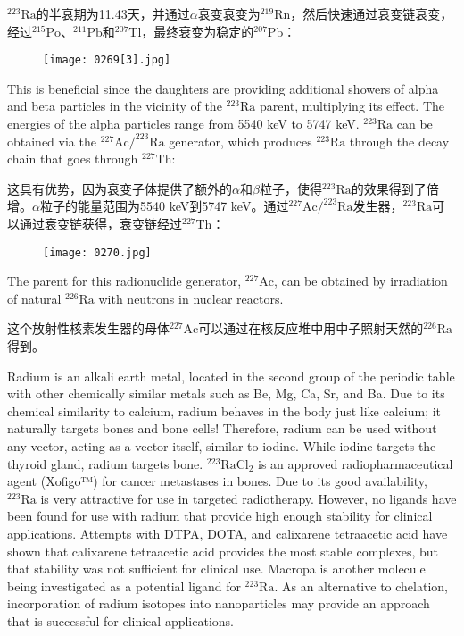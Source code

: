 \documentclass[dvipsnames, svgnames,a4paper,11pt]{article}
\begin{document}
\(\mathrm{^{223}Ra}\)的半衰期为11.43天，并通过$\alpha$衰变衰变为\(\mathrm{^{219}Rn}\)，然后快速通过衰变链衰变，经过\(\mathrm{^{215}Po}\)、\(\mathrm{^{211}Pb}\)和\(\mathrm{^{207}Tl}\)，最终衰变为稳定的\(\mathrm{^{207}Pb}\)：

\begin{figure}[h]
	\centering
    \texttt{[image: 0269[3].jpg]}  
     \label{fig363}
\end{figure}


This is beneficial since the daughters are providing additional showers of alpha and beta particles in the vicinity of the \(\mathrm{^{223}Ra}\) parent, multiplying its effect. The energies of the alpha particles range from 5540 keV to 5747 keV. \(\mathrm{^{223}Ra}\) can be obtained via the \(\mathrm{^{227}Ac/^{223}Ra}\) generator, which produces \(\mathrm{^{223}Ra}\) through the decay chain that goes through \(\mathrm{^{227}Th}\):

这具有优势，因为衰变子体提供了额外的$\alpha$和$\beta$粒子，使得\(\mathrm{^{223}Ra}\)的效果得到了倍增。$\alpha$粒子的能量范围为5540 keV到5747 keV。通过\(\mathrm{^{227}Ac/^{223}Ra}\)发生器，\(\mathrm{^{223}Ra}\)可以通过衰变链获得，衰变链经过\(\mathrm{^{227}Th}\)：

\begin{figure}[h]
	\centering
    \texttt{[image: 0270.jpg]}  
     \label{fig364}
\end{figure}

The parent for this radionuclide generator, \(\mathrm{^{227}Ac}\), can be obtained by irradiation of natural \(\mathrm{^{226}Ra}\) with neutrons in nuclear reactors.

这个放射性核素发生器的母体\(\mathrm{^{227}Ac}\)可以通过在核反应堆中用中子照射天然的\(\mathrm{^{226}Ra}\)得到。

Radium is an alkali earth metal, located in the second group of the periodic table with other chemically similar metals such as Be, Mg, Ca, Sr, and Ba. Due to its chemical similarity to calcium, radium behaves in the body just like calcium; it naturally targets bones and bone cells! Therefore, radium can be used without any vector, acting as a vector itself, similar to iodine. While iodine targets the thyroid gland, radium targets bone. \(\mathrm{^{223}RaCl_2}\) is an approved radiopharmaceutical agent (Xofigo™) for cancer metastases in bones. Due to its good availability, \(\mathrm{^{223}Ra}\) is very attractive for use in targeted radiotherapy. However, no ligands have been found for use with radium that provide high enough stability for clinical applications. Attempts with DTPA, DOTA, and calixarene tetraacetic acid have shown that calixarene tetraacetic acid provides the most stable complexes, but that stability was not sufficient for clinical use. Macropa is another molecule being investigated as a potential ligand for \(\mathrm{^{223}Ra}\). As an alternative to chelation, incorporation of radium isotopes into nanoparticles may provide an approach that is successful for clinical applications.
\end{document}

